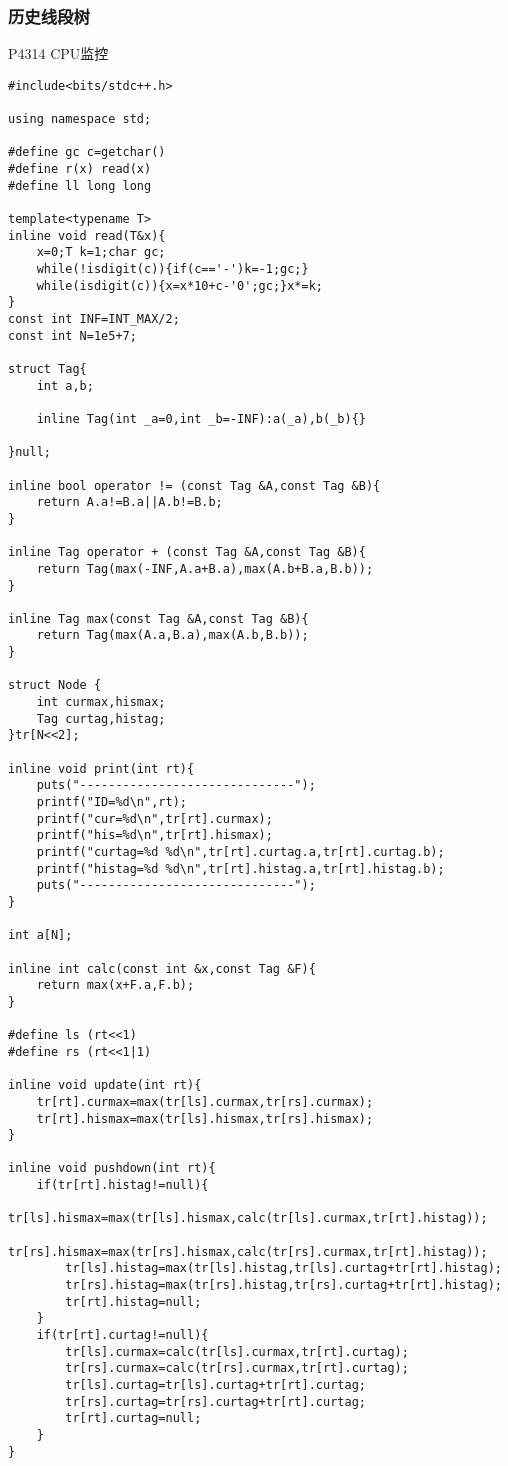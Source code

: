 \documentclass{ctexart}
\begin{document}
\subsubsection{历史线段树}
P4314 CPU监控
\begin{lstlisting}
#include<bits/stdc++.h>

using namespace std;

#define gc c=getchar()
#define r(x) read(x)
#define ll long long

template<typename T>
inline void read(T&x){
    x=0;T k=1;char gc;
    while(!isdigit(c)){if(c=='-')k=-1;gc;}
    while(isdigit(c)){x=x*10+c-'0';gc;}x*=k;
}
const int INF=INT_MAX/2;
const int N=1e5+7;

struct Tag{
	int a,b;
	
	inline Tag(int _a=0,int _b=-INF):a(_a),b(_b){}	
	
}null;

inline bool operator != (const Tag &A,const Tag &B){
	return A.a!=B.a||A.b!=B.b;
}

inline Tag operator + (const Tag &A,const Tag &B){
	return Tag(max(-INF,A.a+B.a),max(A.b+B.a,B.b));
}

inline Tag max(const Tag &A,const Tag &B){
	return Tag(max(A.a,B.a),max(A.b,B.b));
}

struct Node {
	int curmax,hismax;
	Tag curtag,histag;
}tr[N<<2];

inline void print(int rt){
	puts("------------------------------");
	printf("ID=%d\n",rt);
	printf("cur=%d\n",tr[rt].curmax);
	printf("his=%d\n",tr[rt].hismax);
	printf("curtag=%d %d\n",tr[rt].curtag.a,tr[rt].curtag.b);
	printf("histag=%d %d\n",tr[rt].histag.a,tr[rt].histag.b);
	puts("------------------------------");
}

int a[N];

inline int calc(const int &x,const Tag &F){
	return max(x+F.a,F.b);
}

#define ls (rt<<1)
#define rs (rt<<1|1)

inline void update(int rt){
	tr[rt].curmax=max(tr[ls].curmax,tr[rs].curmax);
	tr[rt].hismax=max(tr[ls].hismax,tr[rs].hismax);
}

inline void pushdown(int rt){
	if(tr[rt].histag!=null){
		tr[ls].hismax=max(tr[ls].hismax,calc(tr[ls].curmax,tr[rt].histag));
		tr[rs].hismax=max(tr[rs].hismax,calc(tr[rs].curmax,tr[rt].histag));
		tr[ls].histag=max(tr[ls].histag,tr[ls].curtag+tr[rt].histag);
		tr[rs].histag=max(tr[rs].histag,tr[rs].curtag+tr[rt].histag);
		tr[rt].histag=null;
	}
	if(tr[rt].curtag!=null){
		tr[ls].curmax=calc(tr[ls].curmax,tr[rt].curtag);
		tr[rs].curmax=calc(tr[rs].curmax,tr[rt].curtag);
		tr[ls].curtag=tr[ls].curtag+tr[rt].curtag;
		tr[rs].curtag=tr[rs].curtag+tr[rt].curtag;
		tr[rt].curtag=null;
	}
}


\end{lstlisting}
\end{document}
